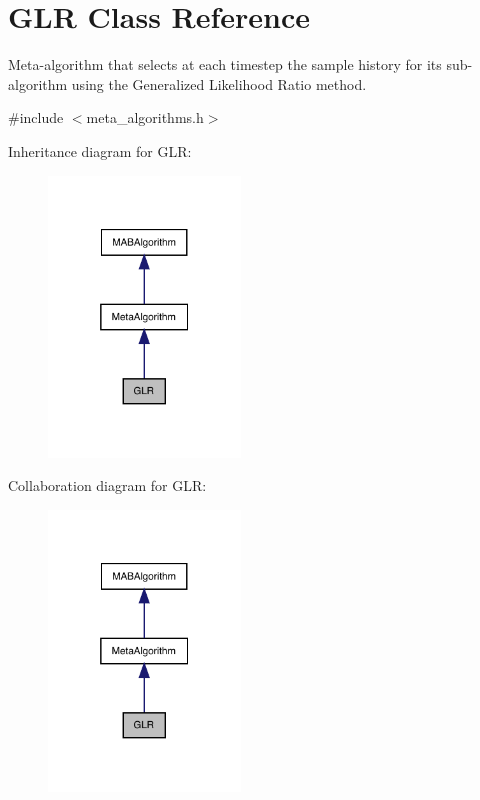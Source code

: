 \hypertarget{class_g_l_r}{}\section{G\+LR Class Reference}
\label{class_g_l_r}


Meta-\/algorithm that selects at each timestep the sample history for its sub-\/algorithm using the Generalized Likelihood Ratio method.  




{\ttfamily \#include $<$meta\+\_\+algorithms.\+h$>$}



Inheritance diagram for G\+LR\+:
\nopagebreak
\begin{figure}[H]
\begin{center}
\leavevmode
\includegraphics[width=145pt]{class_g_l_r__inherit__graph}
\end{center}
\end{figure}


Collaboration diagram for G\+LR\+:
\nopagebreak
\begin{figure}[H]
\begin{center}
\leavevmode
\includegraphics[width=145pt]{class_g_l_r__coll__graph}
\end{center}
\end{figure}
